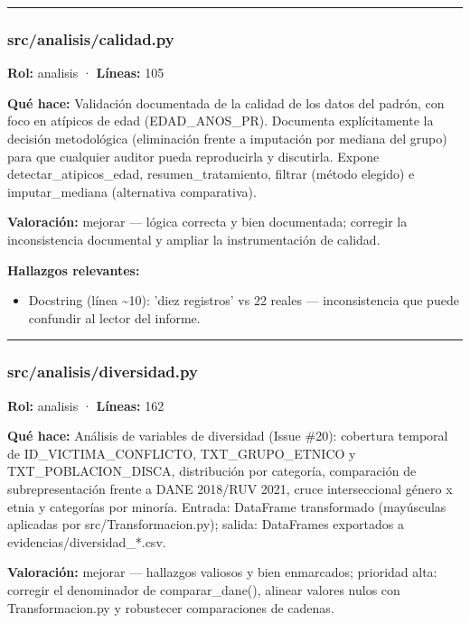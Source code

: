 \medskip
\hrule

\subsubsection{src/analisis/calidad.py}
\textbf{Rol:} analisis · \textbf{Líneas:} 105

\textbf{Qué hace:} Validación documentada de la calidad de los datos del padrón, con foco en atípicos de edad (EDAD\_ANOS\_PR). Documenta explícitamente la decisión metodológica (eliminación frente a imputación por mediana del grupo) para que cualquier auditor pueda reproducirla y discutirla. Expone detectar\_atipicos\_edad, resumen\_tratamiento, filtrar (método elegido) e imputar\_mediana (alternativa comparativa).

\textbf{Valoración:} mejorar --- lógica correcta y bien documentada; corregir la inconsistencia documental y ampliar la instrumentación de calidad.

\textbf{Hallazgos relevantes:}
\begin{itemize}
  \item Docstring (línea \textasciitilde{}10): 'diez registros' vs 22 reales --- inconsistencia que puede confundir al lector del informe.
\end{itemize}

\medskip
\hrule

\subsubsection{src/analisis/diversidad.py}
\textbf{Rol:} analisis · \textbf{Líneas:} 162

\textbf{Qué hace:} Análisis de variables de diversidad (Issue \#20): cobertura temporal de ID\_VICTIMA\_CONFLICTO, TXT\_GRUPO\_ETNICO y TXT\_POBLACION\_DISCA, distribución por categoría, comparación de subrepresentación frente a DANE 2018/RUV 2021, cruce interseccional género x etnia y categorías por minoría. Entrada: DataFrame transformado (mayúsculas aplicadas por src/Transformacion.py); salida: DataFrames exportados a evidencias/diversidad\_*.csv.

\textbf{Valoración:} mejorar --- hallazgos valiosos y bien enmarcados; prioridad alta: corregir el denominador de comparar\_dane(), alinear valores nulos con Transformacion.py y robustecer comparaciones de cadenas.

